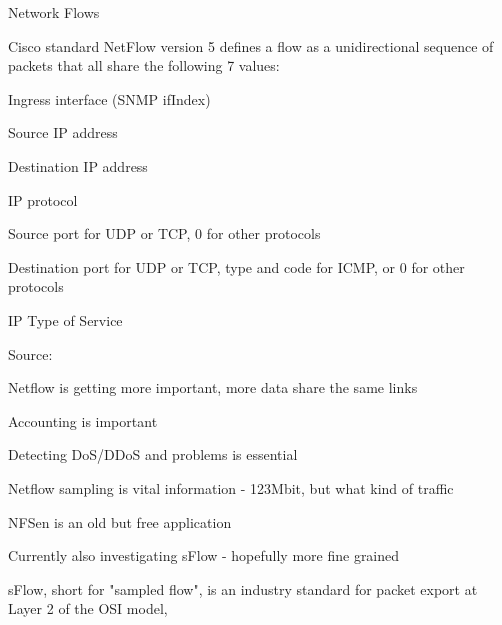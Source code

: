 \documentclass[Screen16to9,17pt]{foils}
\begin{document}




\begin{list1}
\item Network Flows
\item Cisco standard NetFlow version 5 defines a flow as a unidirectional sequence of packets that all share the following 7 values:
\begin{list2}
\item Ingress interface (SNMP ifIndex)
\item Source IP address
\item Destination IP address
\item IP protocol
\item Source port for UDP or TCP, 0 for other protocols
\item Destination port for UDP or TCP, type and code for ICMP, or 0 for other protocols
\item IP Type of Service
\end{list2}
\end{list1}

Source: 



\begin{slidelist}
\item Netflow is getting more important, more data share the same links
\item Accounting is important
\item Detecting DoS/DDoS and problems is essential
\item Netflow sampling is vital information - 123Mbit, but what kind of traffic
\item NFSen is an old but free application
\item Currently also investigating sFlow - hopefully more fine grained
\item sFlow, short for "sampled flow", is an industry standard for packet export at Layer 2 of the OSI model, \\
\end{slidelist}


\end{document}
